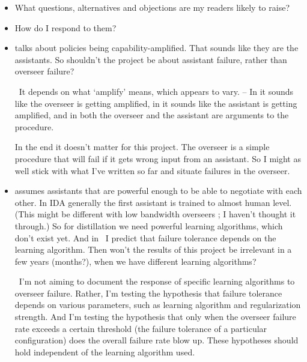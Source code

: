 \documentclass{farlamp}
\begin{document}
\begin{itemize}
\item What questions, alternatives and objections are my readers likely to
    raise?
\item How do I respond to them?
\end{itemize}

\begin{itemize}
    \item \cite{ChriRelAmp} talks about policies being capability-amplified.
        That sounds like they are the assistants. So shouldn't the project be
        about assistant failure, rather than overseer failure?

        \Response\ It depends on what ‘amplify’ means, which appears to vary. –
        In \cite{ChriALBA} it sounds like the overseer is getting amplified, in
        \cite{ChriCapAmp} it sounds like the assistant is getting amplified, and
        in \cite{CotrIDA} both the overseer and the assistant are arguments to
        the  procedure.

        In the end it doesn't matter for this project. The overseer is a simple
        procedure that will fail if it gets wrong input from an assistant. So I
        might as well stick with what I've written so far and situate failures
        in the overseer.

    \item \cite{ChriRelAmp} assumes assistants that are powerful enough to be
        able to negotiate with each other. In IDA generally the first assistant
        is trained to almost human level. (This might be different with low
        bandwidth overseers \parencite{SaunUndIDAClOv}; I haven't thought it
        through.) So for distillation we need powerful learning algorithms,
        which don't exist yet. And in \Overfail\ I predict that failure
        tolerance depends on the learning algorithm. Then won't the results of
        this project be irrelevant in a few years (months?), when we have
        different learning algorithms?

        \Response\ I'm not aiming to document the response of specific learning
        algorithms to overseer failure. Rather, I'm testing the hypothesis that
        failure tolerance depends on various parameters, such as learning
        algorithm and regularization strength. And I'm testing the hypothesis
        that only when the overseer failure rate exceeds a certain threshold
        (the failure tolerance of a particular configuration) does the overall
        failure rate blow up. These hypotheses should hold independent of the
        learning algorithm used.
\end{itemize}
\end{document}
